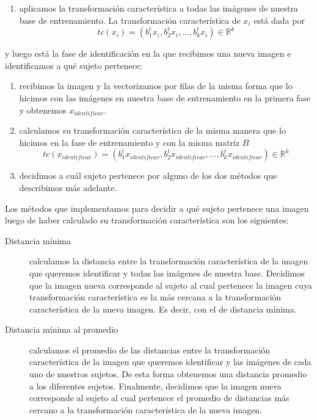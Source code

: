 \begin{enumerate}
 \item aplicamos la transformación característica a todas las imágenes de nuestra base de entrenamiento. La transformación característica
 de $x_i$ está dada por \begin{displaymath}
			    tc(x_i) = ({b_1^t}x_i, {b_2^t}x_i,..., {b_k^t}x_i)\in\mathbb{R}^k
                        \end{displaymath}

\end{enumerate}

y luego está la fase de identificación en la que recibimos una nueva imagen e identificamos a qué sujeto pertenece:
\begin{enumerate}
 \item recibimos la imagen y la vectorizamos por filas de la misma forma que lo hicimos con las imágenes en nuestra base de entrenamiento
 en la primera fase y obtenemos $x_{identificar}$.
 
 \item calculamos su transformación característica de la misma manera que lo hicimos en la fase de entrenamiento y con la misma matriz $B$
  \begin{displaymath}
			    tc(x_{identificar}) = ({b_1^t}x_{identificar}, {b_2^t}x_{identificar},..., {b_k^t}x_{identificar})\in\mathbb{R}^k
  \end{displaymath}
 
 \item decidimos a cuál sujeto pertenece por alguno de los dos métodos que describimos más adelante.

\end{enumerate}
Los métodos que implementamos para decidir a qué sujeto pertenece una imagen luego de haber calculado su transformación
característica son los siguientes:
\begin{description}
  \item[Distancia mínima] calculamos la distancia entre la transformación característica de la imagen que queremos identificar
  y todas las imágenes de nuestra base. Decidimos que la imagen nueva corresponde al sujeto al cual pertenece la imagen cuya transformación
  característica es la más cercana a la transformación característica de la nueva imagen. Es decir, con el de distancia mínima.
  \item[Distancia mínima al promedio] calculamos el promedio de las distancias entre la transformación característica de la imagen que 
  queremos identificar y las imágenes de cada uno de nuestros sujetos. De esta forma obtenemos una distancia promedio a los diferentes sujetos.
  Finalmente, decidimos que la imagen nueva corresponde al sujeto al cual pertenece el promedio de distancias más cercano 
  a la transformación característica de la nueva imagen.
\end{description}

